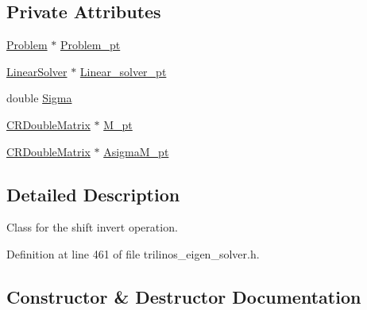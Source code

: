 \subsection*{Private Attributes}
\begin{DoxyCompactItemize}
\item 
\hyperlink{classoomph_1_1Problem}{Problem} $\ast$ \hyperlink{classoomph_1_1ProblemBasedShiftInvertOperator_acff2c7d822f6af10080863f8c9461071}{Problem\+\_\+pt}
\item 
\hyperlink{classoomph_1_1LinearSolver}{Linear\+Solver} $\ast$ \hyperlink{classoomph_1_1ProblemBasedShiftInvertOperator_ab3e4e60c51ea08ac19adf60ed57e95b7}{Linear\+\_\+solver\+\_\+pt}
\item 
double \hyperlink{classoomph_1_1ProblemBasedShiftInvertOperator_a1348c664118ba4fbd87158e2d5d2caef}{Sigma}
\item 
\hyperlink{classoomph_1_1CRDoubleMatrix}{C\+R\+Double\+Matrix} $\ast$ \hyperlink{classoomph_1_1ProblemBasedShiftInvertOperator_abd17d0eac10c19fa6a687fb28f80a3fb}{M\+\_\+pt}
\item 
\hyperlink{classoomph_1_1CRDoubleMatrix}{C\+R\+Double\+Matrix} $\ast$ \hyperlink{classoomph_1_1ProblemBasedShiftInvertOperator_a58f8942b2daecd973333d2dc21c3a387}{Asigma\+M\+\_\+pt}
\end{DoxyCompactItemize}


\subsection{Detailed Description}
Class for the shift invert operation. 

Definition at line 461 of file trilinos\+\_\+eigen\+\_\+solver.\+h.



\subsection{Constructor \& Destructor Documentation}
\mbox{\label{classoomph_1_1ProblemBasedShiftInvertOperator_a2a25d70c81543acf3c97ae7fbe32648e}} 
